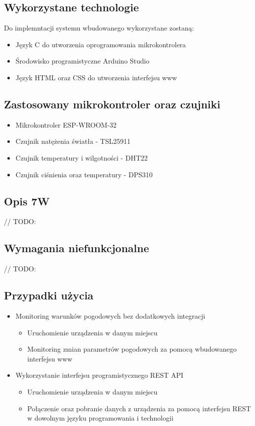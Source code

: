 \documentclass[12pt,a4paper]{article}
\begin{document}
\subsection{Wykorzystane technologie}
Do implemntacji systemu wbudowanego wykorzystane zostaną:
\begin{itemize}
    \item Język C do utworzenia oprogramowania mikrokontrolera
    \item Środowisko programistyczne Arduino Studio
    \item Język HTML oraz CSS do utworzenia interfejsu www
\end{itemize}

\subsection{Zastosowany mikrokontroler oraz czujniki}

\begin{itemize}
    \item Mikrokontroler ESP-WROOM-32
    \item Czujnik natężenia światła - TSL25911
    \item Czujnik temperatury i wilgotności - DHT22
    \item Czujnik ciśnienia oraz temperatury - DPS310
\end{itemize}

\subsection{Opis 7W}

// TODO: 

\subsection{Wymagania niefunkcjonalne}

// TODO: 

\subsection{Przypadki użycia}

\begin{itemize}
    \item Monitoring warunków pogodowych bez dodatkowych integracji
    \begin{itemize}
        \item Uruchomienie urządzenia w danym miejscu
        \item Monitoring zmian parametrów pogodowych za pomocą wbudowanego interfejsu www
    \end{itemize}
    \item Wykorzystanie interfejsu programistycznego REST API
    \begin{itemize}
        \item Uruchomienie urządzenia w danym miejscu
        \item Połączenie oraz pobranie danych z urządzenia za pomocą interfejsu REST w dowolnym języku programowania i technologii
    \end{itemize}
\end{itemize}
\end{document}
